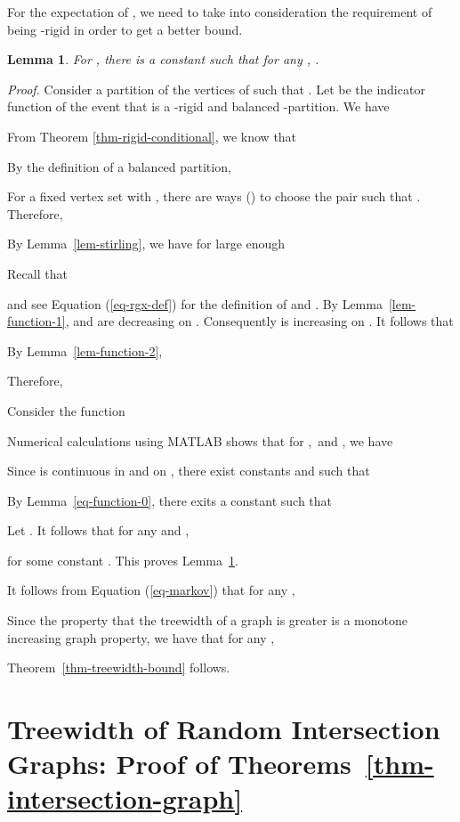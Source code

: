 \documentclass[11pt]{article}
\newtheorem{lemma}{Lemma}[section]
\providecommand{\qed}{\hfill }
\newenvironment{proof}[0]{\textit{Proof.} }{\hfill  \qed}
\begin{document}
For the expectation of , we need to take into consideration the requirement of 
being -rigid in order to get a better bound.  
\begin{lemma}
\label{lem-j-2}
For , there is a constant  such that for any , 
. 
\end{lemma}    
\begin{proof}
Consider a partition  of
the vertices of  such that
. Let 
be the indicator function of the event that
 is a -rigid and balanced -partition. We have

From Theorem \ref{thm-rigid-conditional}, we know that

By the definition of a balanced partition,

For a fixed vertex set  with , there are  ways
() to choose the pair  such that
. Therefore,

By Lemma~\ref{lem-stirling}, we have for  large enough

Recall that  

and see Equation (\ref{eq-rgx-def}) for the definition of  and .
By Lemma~\ref{lem-function-1},  and  are decreasing on . Consequently  is increasing on .
It follows that

By Lemma~\ref{lem-function-2},

Therefore,

Consider the function 

Numerical calculations using MATLAB shows that for ,\ and , we have

Since  is continuous 
in  and  on , there exist constants 
 and  such that 

By Lemma~\ref{eq-function-0}, there exits a constant  such that 

Let . It follows that
 for any  and ,   
 
for some constant .
This proves Lemma~\ref{lem-j-2}.
\end{proof}


It follows from Equation (\ref{eq-markov}) that for any ,

Since the property that the treewidth of a graph is greater 
is a monotone increasing graph property, we have that 
for any ,
   
Theorem~\ref{thm-treewidth-bound} follows.
\qed


\section{Treewidth of Random Intersection Graphs: Proof of Theorems~\ref{thm-intersection-graph}}
\label{sec-thm-2}
\end{document}
